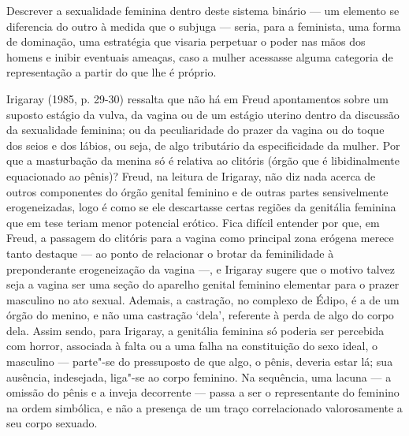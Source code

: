 Descrever a sexualidade feminina dentro deste sistema binário --- um
elemento se diferencia do outro à medida que o subjuga --- seria, para a
feminista, uma forma de dominação, uma estratégia que visaria perpetuar
o poder nas mãos dos homens e inibir eventuais ameaças, caso a mulher
acessasse alguma categoria de representação a partir do que lhe é
próprio.

Irigaray (1985, p. 29-30) ressalta que não há em Freud
apontamentos sobre um suposto estágio da vulva, da vagina ou de um
estágio uterino dentro da discussão da sexualidade feminina; ou da
peculiaridade do prazer da vagina ou do toque dos seios e dos lábios, ou
seja, de algo tributário da especificidade da mulher. Por que a
masturbação da menina só é relativa ao clitóris (órgão que é
libidinalmente equacionado ao pênis)? Freud, na leitura de Irigaray, não
diz nada acerca de outros componentes do órgão genital feminino e de
outras partes sensivelmente erogeneizadas, logo é como se ele
descartasse certas regiões da genitália feminina que em tese teriam
menor potencial erótico. Fica difícil entender por que, em Freud, a
passagem do clitóris para a vagina como principal zona erógena merece
tanto destaque --- ao ponto de relacionar o brotar da feminilidade à
preponderante erogeneização da vagina ---, e Irigaray sugere que o
motivo talvez seja a vagina ser uma seção do aparelho genital feminino
elementar para o prazer masculino no ato sexual. Ademais, a castração,
no complexo de Édipo, é a de um órgão do menino, e não uma castração
`dela', referente à perda de algo do corpo dela. Assim sendo, para
Irigaray, a genitália feminina só poderia ser percebida com horror,
associada à falta ou a uma falha na constituição do sexo ideal, o
masculino --- parte"-se do pressuposto de que algo, o pênis, deveria estar
lá; sua ausência, indesejada, liga"-se ao corpo feminino. Na sequência,
uma lacuna --- a omissão do pênis e a inveja decorrente --- passa a ser o
representante do feminino na ordem simbólica, e não a presença de um
traço correlacionado valorosamente a seu corpo sexuado.

